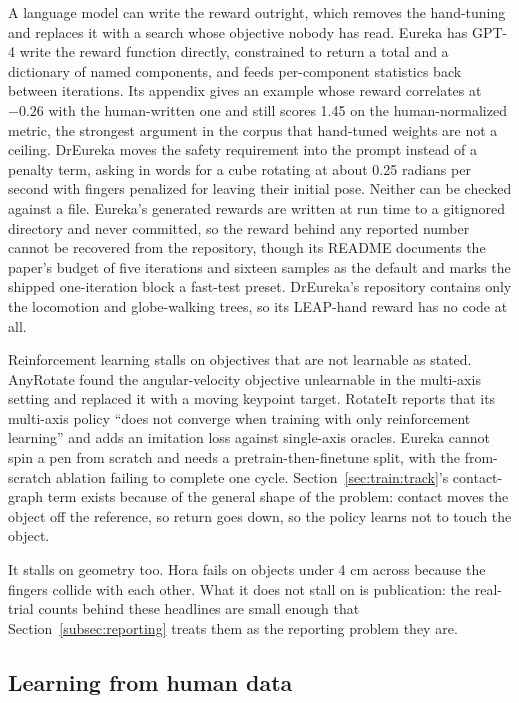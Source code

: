 A language model can write the reward outright, which removes the hand-tuning and replaces it
with a search whose objective nobody has read. Eureka \cite{eureka_2023} has GPT-4 write the
reward function directly, constrained to return a total and a dictionary of named components,
and feeds per-component statistics back between iterations. Its appendix gives an example whose
reward correlates at $-0.26$ with the human-written one and still scores 1.45 on the
human-normalized metric, the strongest argument in the corpus that hand-tuned weights are not a
ceiling. DrEureka \cite{dreureka_2024} moves the safety requirement into the prompt instead of
a penalty term, asking in words for a cube rotating at about 0.25 radians per second with
fingers penalized for leaving their initial pose. Neither can be checked against a file.
Eureka's generated rewards are written at run time to a gitignored directory and never
committed, so the reward behind any reported number cannot be recovered from the repository,
though its README documents the paper's budget of five iterations and sixteen samples as the
default and marks the shipped one-iteration block a fast-test preset. DrEureka's repository
contains only the locomotion and globe-walking trees, so its LEAP-hand reward has no code at
all.

\label{sec:train:rl:stalls}
Reinforcement learning
stalls on objectives that are not learnable as stated. AnyRotate \cite{anyrotate_2024} found
the angular-velocity objective unlearnable in the multi-axis setting and replaced it with a
moving keypoint target. RotateIt \cite{rotateit_2023} reports that its multi-axis policy ``does
not converge when training with only reinforcement learning'' and adds an imitation loss
against single-axis oracles. Eureka \cite{eureka_2023} cannot spin a pen from scratch and needs
a pretrain-then-finetune split, with the from-scratch ablation failing to complete one cycle.
Section~\ref{sec:train:track}'s contact-graph term exists because of the general shape of the
problem: contact moves the object off the reference, so return goes down, so the policy learns
not to touch the object.

It stalls on geometry too. Hora \cite{hora_2022} fails on objects under 4 cm across because the
fingers collide with each other. What it does not stall on is publication: the real-trial
counts behind these headlines are small enough that Section~\ref{subsec:reporting} treats them
as the reporting problem they are.

\subsection{Learning from human data}
\label{sec:train:human}

